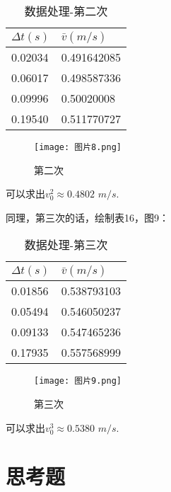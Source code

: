 \documentclass[11pt]{article}
\begin{document}
\begin{table}[!ht]
    \centering
    \begin{tabular}{|l|l|}
    \hline
        $\Delta t(s)$ & $\bar{v}(m/s)$ \\ \hline
        0.02034 & 0.491642085 \\ \hline
        0.06017 & 0.498587336 \\ \hline
        0.09996 & 0.50020008  \\ \hline
        0.19540  & 0.511770727 \\ \hline
    \end{tabular}
    \caption{数据处理-第二次}
\end{table}

\begin{figure}[htbp]
    \centering
    \texttt{[image: 图片8.png]}
    \caption{第二次}
\end{figure}

可以求出$v_0^2\approx 0.4802\,\, m/s$.

\newpage
同理，第三次的话，绘制表16，图9：

\begin{table}[!ht]
    \centering
    \begin{tabular}{|l|l|}
    \hline
        $\Delta t (s)$ & $\bar{v}(m/s)$ \\ \hline
        0.01856 & 0.538793103 \\ \hline
        0.05494 & 0.546050237 \\ \hline
        0.09133 & 0.547465236 \\ \hline
        0.17935 & 0.557568999 \\ \hline
    \end{tabular}
    \caption{数据处理-第三次}
\end{table}

\begin{figure}[htbp]
    \centering
    \texttt{[image: 图片9.png]}
    \caption{第三次}
\end{figure}

可以求出$v_0^3\approx 0.5380\,\, m/s$.

\newpage
\section{思考题}
\end{document}
